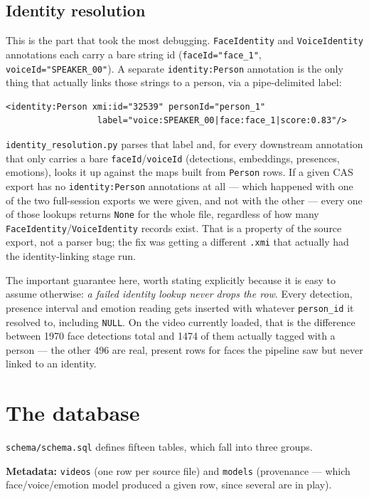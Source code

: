\documentclass[11pt]{article}
\begin{document}
\subsection{Identity resolution}

This is the part that took the most debugging. \texttt{FaceIdentity} and
\texttt{VoiceIdentity} annotations each carry a bare string id
(\texttt{faceId="face\_1"}, \texttt{voiceId="SPEAKER\_00"}). A separate
\texttt{identity:Person} annotation is the only thing that actually links
those strings to a person, via a pipe-delimited label:

\begin{lstlisting}
<identity:Person xmi:id="32539" personId="person_1"
                  label="voice:SPEAKER_00|face:face_1|score:0.83"/>
\end{lstlisting}

\texttt{identity\_resolution.py} parses that label and, for every
downstream annotation that only carries a bare \texttt{faceId}/\texttt{voiceId}
(detections, embeddings, presences, emotions), looks it up against the maps
built from \texttt{Person} rows. If a given CAS export has no
\texttt{identity:Person} annotations at all --- which happened with one of
the two full-session exports we were given, and not with the other --- every
one of those lookups returns \texttt{None} for the whole file, regardless of
how many \texttt{FaceIdentity}/\texttt{VoiceIdentity} records exist. That is
a property of the source export, not a parser bug; the fix was getting a
different \texttt{.xmi} that actually had the identity-linking stage run.

The important guarantee here, worth stating explicitly because it is easy to
assume otherwise: \emph{a failed identity lookup never drops the row}.
Every detection, presence interval and emotion reading gets inserted with
whatever \texttt{person\_id} it resolved to, including \texttt{NULL}. On the
video currently loaded, that is the difference between 1970 face detections
total and 1474 of them actually tagged with a person --- the other 496 are
real, present rows for faces the pipeline saw but never linked to an
identity.

\section{The database}

\texttt{schema/schema.sql} defines fifteen tables, which fall into three
groups.

\textbf{Metadata:} \texttt{videos} (one row per source file) and
\texttt{models} (provenance --- which face/voice/emotion model produced a
given row, since several are in play).
\end{document}

